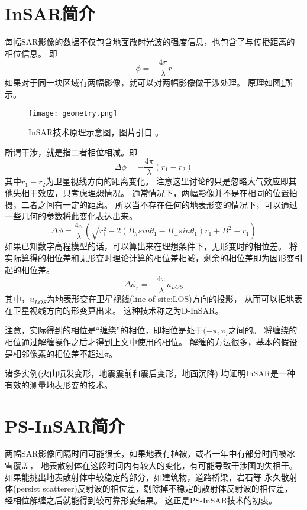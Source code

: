 \section{InSAR简介}
每幅SAR影像的数据不仅包含地面散射光波的强度信息，也包含了与传播距离的相位信息。
即
\begin{equation}
    \phi=-\frac{4\pi}{\lambda}r
\end{equation}
如果对于同一块区域有两幅影像，就可以对两幅影像做干涉处理。
原理如图\ref{fig:geometry}所示。
\begin{figure}[htb]
    \centering
    \texttt{[image: geometry.png]}
    \caption{InSAR技术原理示意图，图片引自
    。}
    \label{fig:geometry}
\end{figure}
所谓干涉，就是指二者相位相减。即
\begin{equation}
    \Delta \phi=-\frac{4\pi}{\lambda}(r_1-r_2)
\end{equation}
其中$r_1-r_2$为卫星视线方向的距离变化。
注意这里讨论的只是忽略大气效应即其他失相干效应，只考虑理想情况。
通常情况下，两幅影像并不是在相同的位置拍摄，二者之间有一定的距离。
所以当不存在任何的地表形变的情况下，可以通过一些几何的参数将此变化表达出来。
\begin{equation}
    \Delta \phi=\frac{4\pi}{\lambda}\left(\sqrt{r_1^2−2(B_hsinθ_1−B_{\perp}sinθ_1)r_1+B^2}−r_1\right)
\end{equation}
如果已知数字高程模型的话，可以算出来在理想条件下，无形变时的相位差。
将实际算得的相位差和无形变时理论计算的相位差相减，剩余的相位差即为因形变引起的相位差。
\begin{equation}
    \Delta \phi_{r}=-\frac{4\pi}{\lambda}u_{LOS}
\end{equation}
其中，$u_{LOS}$为地表形变在卫星视线(line-of-site:LOS)方向的投影，
从而可以把地表在卫星视线方向的形变算出来。
这种技术称之为D-InSAR。

注意，实际得到的相位是“缠绕”的相位，即相位是处于$(-\pi,\pi]$之间的。
将缠绕的相位通过解缠操作之后才得到上文中使用的相位。
解缠的方法很多，基本的假设是相邻像素的相位差不超过$\pi$。

诸多实例(火山喷发变形，地震震前和震后变形，地面沉降)
均证明InSAR是一种有效的测量地表形变的技术。

\section{PS-InSAR简介}
两幅SAR影像间隔时间可能很长，如果地表有植被，或者一年中有部分时间被冰雪覆盖，
地表散射体在这段时间内有较大的变化，有可能导致干涉图的失相干。
如果能挑出地表散射体中较稳定的部分，如建筑物，道路桥梁，岩石等
永久散射体(persist scatterer)反射波的相位差，剔除掉不稳定的散射体反射波的相位差，
经相位解缠之后就能得到较可靠形变结果。
这正是PS-InSAR技术的初衷。

